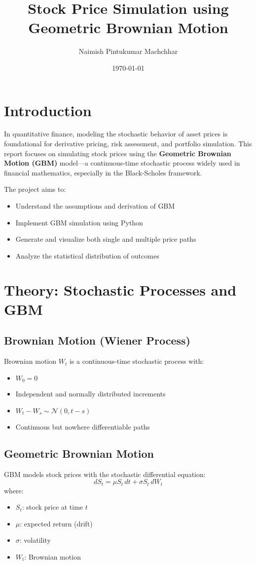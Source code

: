 \documentclass[12pt]{article}
\title{Stock Price Simulation using Geometric Brownian Motion}
\author{Naimish Pintukumar Machchhar}
\date{\today}
\begin{document}
\maketitle

\tableofcontents
\newpage

\section{Introduction}
In quantitative finance, modeling the stochastic behavior of asset prices is foundational for derivative pricing, risk assessment, and portfolio simulation. This report focuses on simulating stock prices using the \textbf{Geometric Brownian Motion (GBM)} model—a continuous-time stochastic process widely used in financial mathematics, especially in the Black-Scholes framework.

The project aims to:
\begin{itemize}
    \item Understand the assumptions and derivation of GBM
    \item Implement GBM simulation using Python
    \item Generate and visualize both single and multiple price paths
    \item Analyze the statistical distribution of outcomes
\end{itemize}

\section{Theory: Stochastic Processes and GBM}

\subsection{Brownian Motion (Wiener Process)}
Brownian motion \( W_t \) is a continuous-time stochastic process with:
\begin{itemize}
    \item \( W_0 = 0 \)
    \item Independent and normally distributed increments
    \item \( W_t - W_s \sim \mathcal{N}(0, t - s) \)
    \item Continuous but nowhere differentiable paths
\end{itemize}

\subsection{Geometric Brownian Motion}
GBM models stock prices with the stochastic differential equation:
\[
dS_t = \mu S_t \, dt + \sigma S_t \, dW_t
\]
where:
\begin{itemize}
    \item \( S_t \): stock price at time \( t \)
    \item \( \mu \): expected return (drift)
    \item \( \sigma \): volatility
    \item \( W_t \): Brownian motion
\end{itemize}
\end{document}
